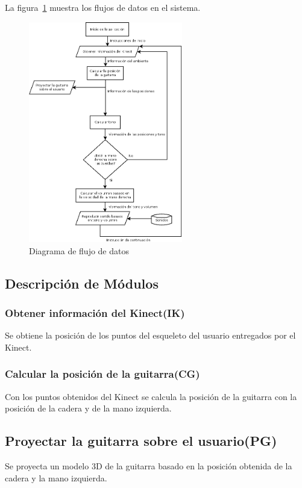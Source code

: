 \documentclass[a4paper,12pt]{article}
\begin{document}
La figura~\ref{fig:flujo} muestra los flujos de datos en el sistema.

\begin{figure}[h!]
        \centering
        \includegraphics[width=0.6\textwidth]{../imagenes/diagrama_de_flujo.png}
        \caption{Diagrama de flujo de datos}
        \label{fig:flujo}
\end{figure}
\newpage

\subsection{Descripción de Módulos}
\subsubsection{Obtener información del Kinect(IK)}
Se obtiene la posición de los puntos del esqueleto del usuario entregados por el
Kinect.
\subsubsection{Calcular la posición de la guitarra(CG)}
Con los puntos obtenidos del Kinect se calcula la posición de la guitarra con la
posición de la cadera y de la mano izquierda.
\subsection{Proyectar la guitarra sobre el usuario(PG)}
Se proyecta un modelo 3D de la guitarra basado en la posición obtenida de la
cadera y la mano izquierda.
\end{document}
